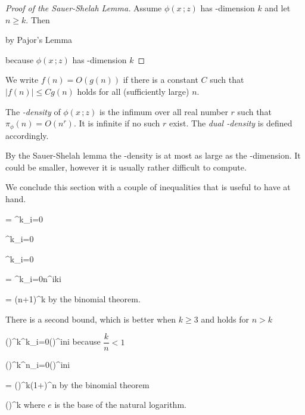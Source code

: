 \documentclass[scombinatorics.tex]{subfiles}
\begin{document}
\begin{proof}[Proof of the Sauer-Shelah Lemma]
  Assume $\phi(x\,;z)$ has \vc-dimension $k$ and let $n\ge k$.
  Then

  \smallskip

  \hfill by  Pajor's Lemma\smallskip
  
  \hfill because $\phi(x\,;z)$ has \vc-dimension $k$
\end{proof}

We write $f(n)=O(g(n))$ if there is a constant $C$ such that $|f(n)|\le C g(n)$ holds for all (sufficiently large) $n$.

The \emph{\vc-density\/} of $\phi(x\,;z)$ is the infimum over all real number $r$ such that $\pi_\phi(n)= O(n^r)$.
It is infinite if no such $r$ exist.
The  \emph{dual \vc-density\/} is defined accordingly.

By the Sauer-Shelah lemma the \vc-density is at most as large as the \vc-dimension.
It could be smaller, however it is usually rather difficult to compute.

We conclude this section with a couple of inequalities that is useful to have at hand.

{=}
{\sum^k_{i=0}}

\ceq{}
{\le}
{\sum^k_{i=0}}

\ceq{}
{\le}
{\sum^k_{i=0}}

\ceq{}
{=}
{\sum^k_{i=0}n^i{k\choose i}}

\ceq{}
{=}
{(n+1)^k}
\hfill by the binomial theorem.\smallskip

There is a second bound, which is better when $k\ge 3$ and holds for $n>k$

{\le}
{\Big(\Big)^{\!k}\sum^k_{i=0}\Big(\Big)^{\!i}{n\choose i}}
\hfill because $\dfrac{k}{n}<1$

\ceq{}
{\le}
{\Big(\Big)^{\!k}\sum^n_{i=0}\Big(\Big)^{\!i}{n\choose i}}

\ceq{}
{=}
{\Big(\Big)^{\!k}\Big(1+\Big)^n}
\hfill by the binomial theorem

\ceq{}
{\le}
{\Big(\Big)^{\!k}}
\hfill where $e$ is the base of the natural logarithm.
\end{document}
